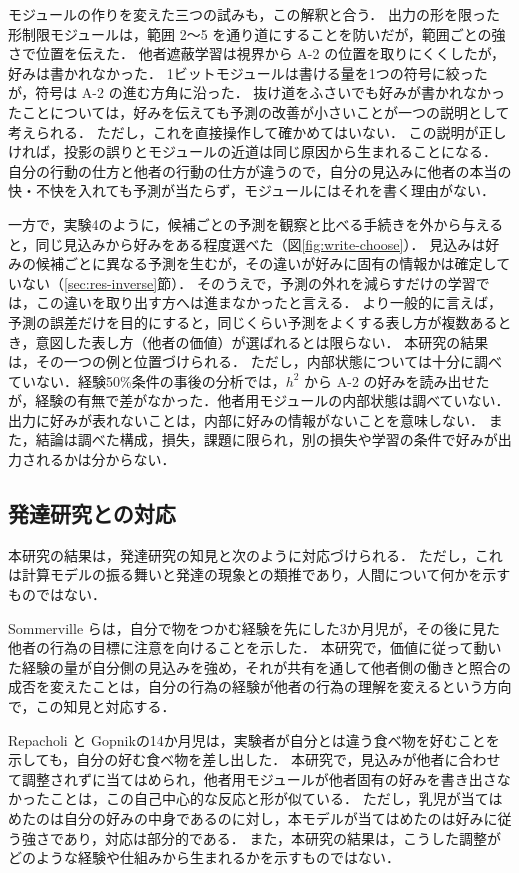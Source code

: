 モジュールの作りを変えた三つの試みも，この解釈と合う．
出力の形を限った形制限モジュールは，範囲 2〜5 を通り道にすることを防いだが，範囲ごとの強さで位置を伝えた．
他者遮蔽学習は視界から A-2 の位置を取りにくくしたが，好みは書かれなかった．
1ビットモジュールは書ける量を1つの符号に絞ったが，符号は A-2 の進む方角に沿った．
抜け道をふさいでも好みが書かれなかったことについては，好みを伝えても予測の改善が小さいことが一つの説明として考えられる．
ただし，これを直接操作して確かめてはいない．
この説明が正しければ，投影の誤りとモジュールの近道は同じ原因から生まれることになる．
自分の行動の仕方と他者の行動の仕方が違うので，自分の見込みに他者の本当の快・不快を入れても予測が当たらず，モジュールにはそれを書く理由がない．

一方で，実験4のように，候補ごとの予測を観察と比べる手続きを外から与えると，同じ見込みから好みをある程度選べた（図\ref{fig:write-choose}）．
見込みは好みの候補ごとに異なる予測を生むが，その違いが好みに固有の情報かは確定していない（\ref{sec:res-inverse}節）．
そのうえで，予測の外れを減らすだけの学習では，この違いを取り出す方へは進まなかったと言える．
より一般的に言えば，予測の誤差だけを目的にすると，同じくらい予測をよくする表し方が複数あるとき，意図した表し方（他者の価値）が選ばれるとは限らない．
本研究の結果は，その一つの例と位置づけられる．
ただし，内部状態については十分に調べていない．経験50\%条件の事後の分析では，$h^2$ から A-2 の好みを読み出せたが，経験の有無で差がなかった．他者用モジュールの内部状態は調べていない．
出力に好みが表れないことは，内部に好みの情報がないことを意味しない．
また，結論は調べた構成，損失，課題に限られ，別の損失や学習の条件で好みが出力されるかは分からない．

\subsection{発達研究との対応}\label{sec:disc-dev}
本研究の結果は，発達研究の知見と次のように対応づけられる．
ただし，これは計算モデルの振る舞いと発達の現象との類推であり，人間について何かを示すものではない．

Sommerville ら\cite{sommerville2005action}は，自分で物をつかむ経験を先にした3か月児が，その後に見た他者の行為の目標に注意を向けることを示した．
本研究で，価値に従って動いた経験の量が自分側の見込みを強め，それが共有を通して他者側の働きと照合の成否を変えたことは，自分の行為の経験が他者の行為の理解を変えるという方向で，この知見と対応する．

Repacholi と Gopnik\cite{repacholi1997early}の14か月児は，実験者が自分とは違う食べ物を好むことを示しても，自分の好む食べ物を差し出した．
本研究で，見込みが他者に合わせて調整されずに当てはめられ，他者用モジュールが他者固有の好みを書き出さなかったことは，この自己中心的な反応と形が似ている．
ただし，乳児が当てはめたのは自分の好みの中身であるのに対し，本モデルが当てはめたのは好みに従う強さであり，対応は部分的である．
また，本研究の結果は，こうした調整がどのような経験や仕組みから生まれるかを示すものではない．

